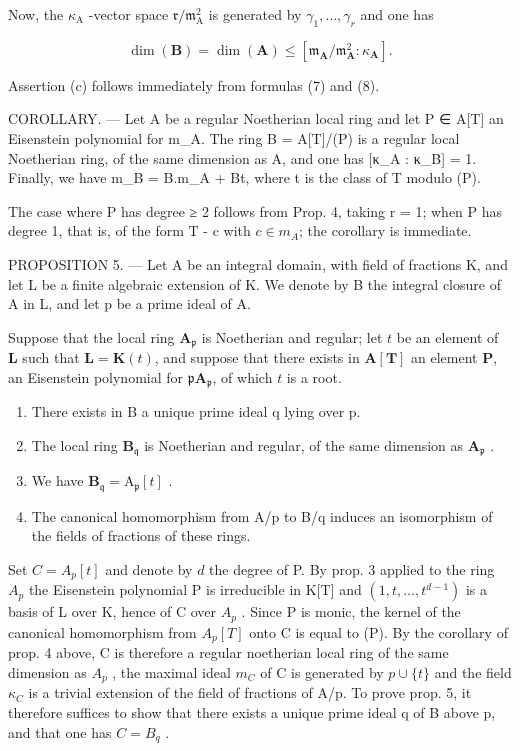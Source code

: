Now, the \(\kappa_{\mathrm{A}}\) -vector space \(\mathfrak{r}/\mathfrak{m}_{\mathrm{A}}^{2}\) is generated by \(\gamma_{1}, \ldots, \gamma_{r}\) and one has

\[
\dim (\mathbf {B}) = \dim (\mathbf {A}) \leqslant [ \mathfrak {m} _ {\mathbf {A}} / \mathfrak {m} _ {\mathbf {A}} ^ {2}: \kappa_ {\mathbf {A}} ].\tag{8}
\]

Assertion (c) follows immediately from formulas (7) and (8).

COROLLARY. --- Let A be a regular Noetherian local ring and let P ∈ A{[}T{]} an Eisenstein polynomial for m\_A. The ring B = A{[}T{]}/(P) is a regular local Noetherian ring, of the same dimension as A, and one has {[}κ\_A : κ\_B{]} = 1. Finally, we have m\_B = B.m\_A + Bt, where t is the class of T modulo (P).

The case where P has degree ≥ 2 follows from Prop. 4, taking r = 1; when P has degree 1, that is, of the form T - c with \(c \in m_{A}\); the corollary is immediate.

PROPOSITION 5. --- Let A be an integral domain, with field of fractions K, and let L be a finite algebraic extension of K. We denote by B the integral closure of A in L, and let p be a prime ideal of A.

Suppose that the local ring \(\mathbf{A}_{\mathfrak{p}}\) is Noetherian and regular; let \(t\) be an element of \(\mathbf{L}\) such that \(\mathbf{L} = \mathbf{K}(t)\), and suppose that there exists in \(\mathbf{A}[\mathbf{T}]\) an element \(\mathbf{P}\), an Eisenstein polynomial for \(\mathfrak{p}\mathbf{A}_{\mathfrak{p}}\), of which \(t\) is a root.

\begin{enumerate}
\def\labelenumi{\alph{enumi})}
\item
  There exists in B a unique prime ideal q lying over p.
\item
  The local ring \(\mathbf{B}_{\mathfrak{q}}\) is Noetherian and regular, of the same dimension as \(\mathbf{A}_{\mathfrak{p}}\) .
\item
  We have \(\mathbf{B}_{\mathfrak{q}} = \mathrm{A}_{\mathfrak{p}}[t]\) .
\item
  The canonical homomorphism from A/p to B/q induces an isomorphism of the fields of fractions of these rings.
\end{enumerate}

Set \(C = A_{p}[t]\) and denote by \(d\) the degree of P. By prop. 3 applied to the ring \(A_{p}\) the Eisenstein polynomial P is irreducible in K{[}T{]} and \((1, t, ..., t^{d-1})\) is a basis of L over K, hence of C over \(A_{p}\) . Since P is monic, the kernel of the canonical homomorphism from \(A_{p}[T]\) onto C is equal to (P). By the corollary of prop. 4 above, C is therefore a regular noetherian local ring of the same dimension as \(A_{p}\) , the maximal ideal \(m_{C}\) of C is generated by \(p \cup \{t\}\) and the field \(\kappa_{C}\) is a trivial extension of the field of fractions of A/p. To prove prop. 5, it therefore suffices to show that there exists a unique prime ideal q of B above p, and that one has \(C = B_{q}\) .

